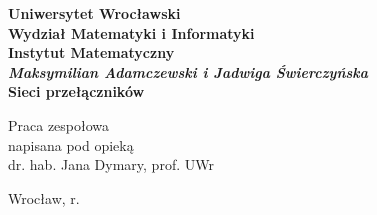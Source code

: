 \documentclass[a4paper]{article}
\theoremstyle{definition}
\begin{document}

\newpage
\thispagestyle{empty}
\begin{center}
\textbf{\large Uniwersytet Wrocławski\\
Wydział Matematyki i Informatyki\\
Instytut Matematyczny}\\
\vspace{4cm}
\textbf{\textit{\large Maksymilian Adamczewski i Jadwiga Świerczyńska}\\
\vspace{0.5cm}
{\Large Sieci przełączników}}\\
\end{center}
\vspace{3cm}
{\large \hspace*{6.5cm}Praca zespołowa\\
\hspace*{6.5cm}napisana pod opieką\\
\hspace*{6.5cm}dr. hab. Jana Dymary, prof. UWr }\\
\vfill
\begin{center}
{\large Wrocław, \the\year{} r.}\\
\end{center}


\newpage

\null\vfill

\begin{abstract}
    W poniższej pracy przedstawiamy definicje przełącznika oraz sieci przełączników. Najpierw pokazujemy konstrukcje sieci realizujących symetrię, przesunięcie cykliczne czy dowolną permutację. Następnie przedstawiamy konstrukcję sieci Beneša--Waksmana realizującą wszystkie permutacje oraz jej optymalizację. Na końcu konstruujemy sieć realizującą wszystkie przesunięcia cykliczne oraz przesunięcia cykliczne o potęgi 2.  
\end{abstract}

\vfill




\tableofcontents

\newpage


\end{document}
